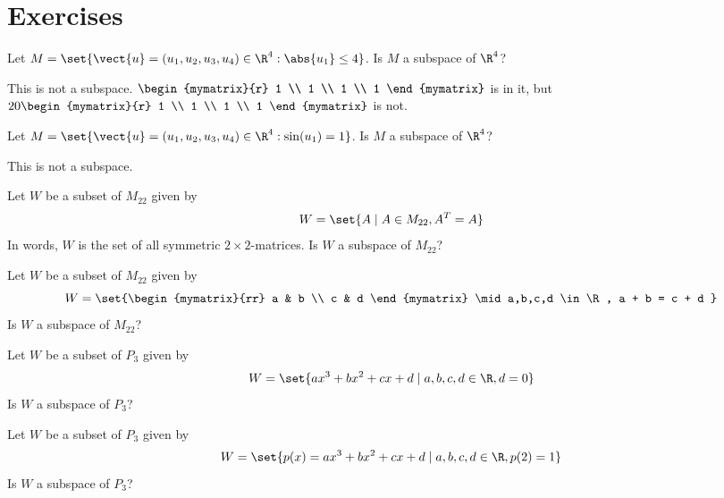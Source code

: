 \section*{Exercises}


\begin{ex} Let $M=\set{\vect{u}=(u_{1},u_{2},u_{3},u_{4}) \in 
\R^{4}:\abs{u_{1}} \leq 4}$. Is $M$ a subspace of $\R^4$?
\begin{sol}
This is not a subspace. $\begin{mymatrix}{r}
1 \\
1 \\
1 \\
1
\end{mymatrix} $ is in
it, but $20\begin{mymatrix}{r}
1 \\
1 \\
1 \\
1
\end{mymatrix} $ is not. 
\end{sol}
\end{ex}

\begin{ex} Let $M=\set{\vect{u}=(u_{1},u_{2},u_{3},u_{4}) \in 
\R^{4}:\sin (u_{1}) =1}$. Is $M$ a subspace of $\R^4$?
\begin{sol}
This is not a subspace.
\end{sol}
\end{ex}

\begin{ex} Let $W$ be a subset of $M_{22}$ given by 
\[
W = \set{A \mid A \in M_{22}, A^T = A }  
\]
In words, $W$ is the set of all symmetric $2 \times 2$-matrices. Is $W$ a subspace of $M_{22}$?
\end{ex}

\begin{ex} Let $W$ be a subset of $M_{22}$ given by 
\[
W = \set{\begin{mymatrix}{rr}
a  & b \\
c & d 
\end{mymatrix} \mid a,b,c,d \in \R, a + b = c + d }
\]
Is $W$ a subspace of $M_{22}$?
\end{ex}

\begin{ex} Let $W$ be a subset of $P_3$ given by 
\[
W = \set{
ax^3 + bx^2 + cx + d \mid a,b,c,d \in \R, d = 0 }
\]
Is $W$ a subspace of $P_3$?
\end{ex}

\begin{ex} Let $W$ be a subset of $P_3$ given by 
\[
W = \set{
p(x) = ax^3 + bx^2 + cx + d \mid a,b,c,d \in \R, p(2) = 1 }
\]
Is $W$ a subspace of $P_3$?
\end{ex}

